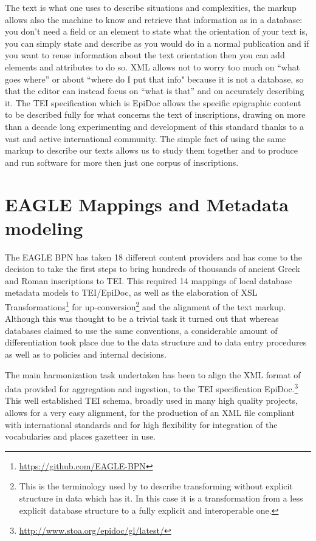 \documentclass[amsthm,ebook]{saparticle}
\begin{document}
The text is what one uses to describe situations and complexities, the markup allows also the machine to know and retrieve that information as in a database: you don't need a field or an element to state what the orientation of your text is, you can simply state and describe as you would do in a normal publication and if you want to reuse information about the text orientation then you can add elements and attributes to do so. XML allows not to worry too much on ``what goes where'' or about ``where do I put that info" because it is not a database, so that the editor can instead focus on ``what is that'' and on accurately describing it. The TEI specification which is EpiDoc allows the specific epigraphic content to be described fully for what concerns the text of inscriptions, drawing on more than a decade long experimenting and development of this standard thanks to a vast and active international community. The simple fact of using the same markup to describe our texts allows us to study them together and to produce and run software for more then just one corpus of inscriptions. 

\section{EAGLE Mappings and Metadata modeling}
The EAGLE BPN has taken 18 different content providers and has come to
the decision to take the first steps to bring hundreds of thousands of
ancient Greek and Roman inscriptions to TEI. This required 14 mappings
of local database metadata models to TEI/EpiDoc, as well as the elaboration of
XSL Transformations\footnote{\url{https://github.com/EAGLE-BPN}} for up-conversion\footnote{This is the terminology used by \citet[906]{Kay} to describe transforming without explicit structure in data which has it. In this case it is a transformation from a less explicit database structure to a fully explicit and interoperable one.} and the alignment of the text
markup. Although this was thought to be a trivial task it turned out
that whereas databases claimed to use the same conventions, a considerable amount of differentiation took place due to the data structure and to data entry procedures as well as to policies and internal decisions. 

The main harmonization task undertaken has been to align the XML format
of data provided for aggregation and ingestion, to the TEI
specification EpiDoc.\footnote{\url{http://www.stoa.org/epidoc/gl/latest/}} This well established TEI schema, broadly used in
many high quality projects, allows for a very easy alignment, for the
production of an XML file compliant with international standards and
for high flexibility for integration of the vocabularies and places
gazetteer in use.
\end{document}
